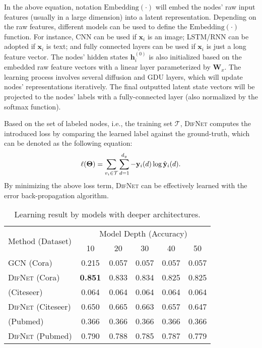 \documentclass{article}
\newcommand{\mb}{\mathbf}
\newcommand{\bs}{\boldsymbol}
\newcommand{\mc}{\mathcal}
\newcommand{\our}{\textsc{DifNet}}
\newcommand{\gdu}{\textsc{GDU}}
\newcommand{\gcn}{\textsc{GCN}}
\begin{document}
In the above equation, notation $\mbox{Embedding}(\cdot)$ will embed the nodes' raw input features (usually in a large dimension) into a latent representation. Depending on the raw features, different models can be used to define the $\mbox{Embedding}(\cdot)$ function. For instance, CNN can be used if $\mb{x}_i$ is an image; LSTM/RNN can be adopted if $\mb{x}_i$ is text; and fully connected layers can be used if $\mb{x}_i$ is just a long feature vector. The nodes' hidden states $\mb{h}_i^{(0)}$ is also initialized based on the embedded raw feature vectors with a linear layer parameterized by $\mb{W}_x$. The learning process involves several diffusion and {\gdu} layers, which will update nodes' representations iteratively. The final outputted latent state vectors will be projected to the nodes' labels with a fully-connected layer (also normalized by the softmax function).

Based on the set of labeled nodes, i.e., the training set $\mc{T}$, {\our} computes the introduced loss by comparing the learned label against the ground-truth, which can be denoted as the following equation: \vspace{-9pt}
\begin{equation}
\ell(\bs{\Theta}) = \sum_{v_i \in \mc{T}}  \sum_{d=1}^{d_y} - \mb{y}_i(d) \log \hat{\mb{y}}_i(d). \vspace{-5pt}
\end{equation}
By minimizing the above loss term, {\our} can be effectively learned with the error back-propagation algorithm. 


\begin{table}[t]
\caption{Learning result by models with deeper architectures.}\label{tab:suspended_animation}
\centering
\small
\setlength{\tabcolsep}{4pt}
\begin{tabular}{l c c  c  c  c }
\toprule
 \multirow{2}{*}{Method (Dataset)}  & \multicolumn{5}{c}{Model Depth (Accuracy)} \\
 \addlinespace[0.05cm]
\cline{2-6}
\addlinespace[0.05cm]
& {10} & {20} & {30} & {40} & {50} \\
\addlinespace[0.05cm]
\hline
\addlinespace[0.05cm]

{\gcn} (Cora)  &0.215  &0.057  &0.057 &{0.057} &{0.057} \\

{\our} (Cora) &\textbf{0.851}  &{0.833}  &{0.834} &{0.825} &{0.825} \\
\hline
\addlinespace[0.05cm]
{\gcn} (Citeseer)&0.064  &0.064  &0.064 &{0.064} &{0.064} \\

{\our} (Citeseer) &0.650  &{0.665}  &{0.663} &{0.657} &{0.647} \\
\hline
\addlinespace[0.05cm]
{\gcn} (Pubmed) &0.366 &0.366  &0.366 &{0.366} &{0.366} \\

{\our} (Pubmed) &0.790  &{0.788}  &{0.785} &{0.787} &{0.779}\\
\bottomrule
\end{tabular}
\vspace{-10pt}
\end{table}
\end{document}
